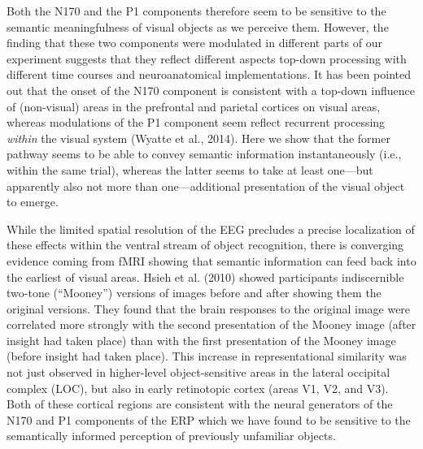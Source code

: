 \documentclass[
  english,
  doc,12pt,twoside,floatsintext]{apa7}
\begin{document}
Both the N170 and the P1 components therefore seem to be sensitive to the semantic meaningfulness of visual objects as we perceive them. However, the finding that these two components were modulated in different parts of our experiment suggests that they reflect different aspects top-down processing with different time courses and neuroanatomical implementations. It has been pointed out that the onset of the N170 component is consistent with a top-down influence of (non-visual) areas in the prefrontal and parietal cortices on visual areas, whereas modulations of the P1 component seem reflect recurrent processing \emph{within} the visual system (Wyatte et al., 2014). Here we show that the former pathway seems to be able to convey semantic information instantaneously (i.e., within the same trial), whereas the latter seems to take at least one---but apparently also not more than one---additional presentation of the visual object to emerge.

While the limited spatial resolution of the EEG precludes a precise localization of these effects within the ventral stream of object recognition, there is converging evidence coming from fMRI showing that semantic information can feed back into the earliest of visual areas. Hsieh et al. (2010) showed participants indiscernible two-tone (``Mooney'') versions of images before and after showing them the original versions. They found that the brain responses to the original image were correlated more strongly with the second presentation of the Mooney image (after insight had taken place) than with the first presentation of the Mooney image (before insight had taken place). This increase in representational similarity was not just observed in higher-level object-sensitive areas in the lateral occipital complex (LOC), but also in early retinotopic cortex (areas V1, V2, and V3). Both of these cortical regions are consistent with the neural generators of the N170 and P1 components of the ERP which we have found to be sensitive to the semantically informed perception of previously unfamiliar objects.
\end{document}
